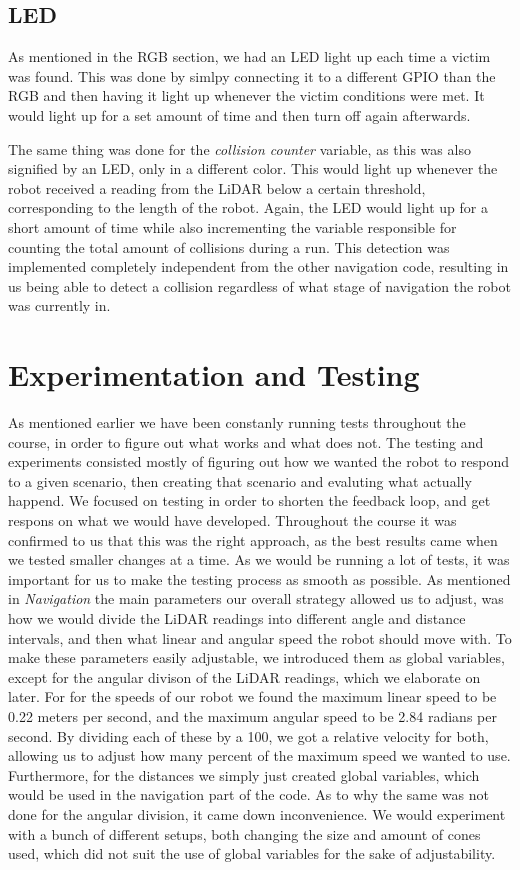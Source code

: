 \documentclass[conference]{IEEEtran}
\begin{document}
\subsection{LED}
As mentioned in the RGB section, we had an LED light up each time a victim was found. This was done by simlpy connecting it to a different GPIO than the RGB and then having it light up whenever the victim conditions were met.
It would light up for a set amount of time and then turn off again afterwards.

The same thing was done for the \textit{collision counter} variable, as this was also signified by an LED, only in a different color.
This would light up whenever the robot received a reading from the LiDAR below a certain threshold, corresponding to the length of the robot.
Again, the LED would light up for a short amount of time while also incrementing the variable responsible for counting the total amount of collisions during a run.
This detection was implemented completely independent from the other navigation code, resulting in us being able to detect a collision regardless of what stage of navigation the robot was currently in.

\section{Experimentation and Testing}
As mentioned earlier we have been constanly running tests throughout the course, in order to figure out what works and what does not.
The testing and experiments consisted mostly of figuring out how we wanted the robot to respond to a given scenario, then creating that scenario and evaluting what actually happend.
We focused on testing in order to shorten the feedback loop, and get respons on what we would have developed.
Throughout the course it was confirmed to us that this was the right approach, as the best results came when we tested smaller changes at a time.
As we would be running a lot of tests, it was important for us to make the testing process as smooth as possible.
As mentioned in \textit{Navigation} the main parameters our overall strategy allowed us to adjust, was how we would divide the LiDAR readings into different angle and distance intervals, and then what linear and angular speed the robot should move with.
To make these parameters easily adjustable, we introduced them as global variables, except for the angular divison of the LiDAR readings, which we elaborate on later.
For for the speeds of our robot we found the maximum linear speed to be 0.22 meters per second, and the maximum angular speed to be 2.84 radians per second.
By dividing each of these by a 100, we got a relative velocity for both, allowing us to adjust how many percent of the maximum speed we wanted to use.
Furthermore, for the distances we simply just created global variables, which would be used in the navigation part of the code.
As to why the same was not done for the angular division, it came down inconvenience.
We would experiment with a bunch of different setups, both changing the size and amount of cones used, which did not suit the use of global variables for the sake of adjustability.
\end{document}
